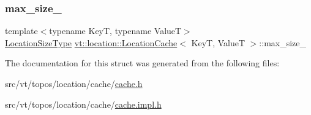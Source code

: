\mbox{\label{structvt_1_1location_1_1_location_cache_ad0073d311deb0afe733c3d35f1f7f912}} 
\subsubsection{\texorpdfstring{max\+\_\+size\+\_\+}{max\_size\_}}
{\footnotesize\ttfamily template$<$typename KeyT, typename ValueT$>$ \\
\hyperlink{namespacevt_1_1location_ab1c4c5849012a23eee2fbd1fce6159d7}{Location\+Size\+Type} \hyperlink{structvt_1_1location_1_1_location_cache}{vt\+::location\+::\+Location\+Cache}$<$ KeyT, ValueT $>$\+::max\+\_\+size\+\_\+\hspace{0.3cm}{\ttfamily [private]}}



The documentation for this struct was generated from the following files\+:\begin{DoxyCompactItemize}
\item 
src/vt/topos/location/cache/\hyperlink{topos_2location_2cache_2cache_8h}{cache.\+h}\item 
src/vt/topos/location/cache/\hyperlink{cache_8impl_8h}{cache.\+impl.\+h}\end{DoxyCompactItemize}
